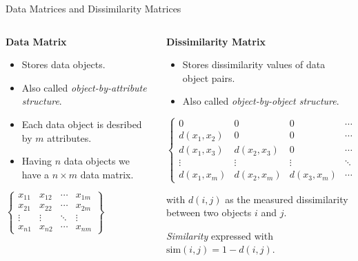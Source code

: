 \begin{frame}{Data Matrices and Dissimilarity Matrices}
	\begin{columns}
		\begin{column}{0.5\textwidth}
			\textbf{Data Matrix}

			\begin{itemize}
				\item Stores data objects.
				\item Also called \textit{object-by-attribute structure}.
				\item Each data object is desribed by $m$ attributes.
				\item Having $n$ data objects we have a $n\times m$ data matrix.
			\end{itemize}
			\vspace*{1em}
			\begin{center}
				{$\begin{Bmatrix}
							x_{11} & x_{12} & \cdots & x_{1m} \\
							x_{21} & x_{22} & \cdots & x_{2m} \\
							\vdots & \vdots & \ddots & \vdots \\
							x_{n1} & x_{n2} & \cdots & x_{nm}
						\end{Bmatrix}$ }
			\end{center}
		\end{column}

		\begin{column}{0.5\textwidth}
			\textbf{Dissimilarity Matrix}

			\begin{itemize}
				\item Stores dissimilarity values of data object pairs.
				\item Also called \textit{object-by-object structure}.
			\end{itemize}
			\begin{center}
				{$\begin{Bmatrix}
							0              & 0              & 0              & \cdots & 0      \\
							d(x_{1},x_{2}) & 0              & 0              & \cdots & 0      \\
							d(x_{1},x_{3}) & d(x_{2},x_{3}) & 0              & \cdots & 0      \\
							\vdots         & \vdots         & \vdots         & \ddots & \vdots \\
							d(x_{1},x_{m}) & d(x_{2},x_{m}) & d(x_{3},x_{m}) & \cdots & 0
						\end{Bmatrix}$}
			\end{center}
			with $d(i, j)$ as the measured dissimilarity between two objects $i$ and $j$.

			\textit{Similarity} expressed with $\text{sim}(i,j) = 1 - d(i, j)$.
		\end{column}
	\end{columns}
\end{frame}

